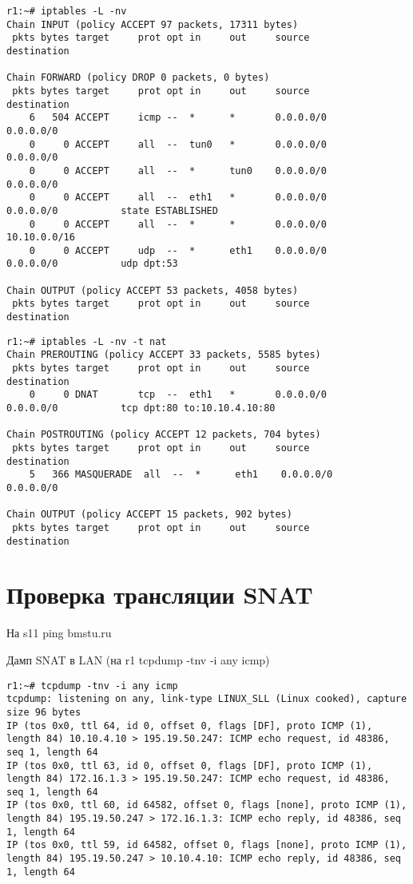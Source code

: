 \documentclass[a4paper,12pt]{article}
\begin{document}
\begin{Verbatim}
r1:~# iptables -L -nv
Chain INPUT (policy ACCEPT 97 packets, 17311 bytes)
 pkts bytes target     prot opt in     out     source               destination         

Chain FORWARD (policy DROP 0 packets, 0 bytes)
 pkts bytes target     prot opt in     out     source               destination         
    6   504 ACCEPT     icmp --  *      *       0.0.0.0/0            0.0.0.0/0           
    0     0 ACCEPT     all  --  tun0   *       0.0.0.0/0            0.0.0.0/0           
    0     0 ACCEPT     all  --  *      tun0    0.0.0.0/0            0.0.0.0/0           
    0     0 ACCEPT     all  --  eth1   *       0.0.0.0/0            0.0.0.0/0           state ESTABLISHED 
    0     0 ACCEPT     all  --  *      *       0.0.0.0/0            10.10.0.0/16        
    0     0 ACCEPT     udp  --  *      eth1    0.0.0.0/0            0.0.0.0/0           udp dpt:53 

Chain OUTPUT (policy ACCEPT 53 packets, 4058 bytes)
 pkts bytes target     prot opt in     out     source               destination         
\end{Verbatim}

\begin{Verbatim}
r1:~# iptables -L -nv -t nat
Chain PREROUTING (policy ACCEPT 33 packets, 5585 bytes)
 pkts bytes target     prot opt in     out     source               destination         
    0     0 DNAT       tcp  --  eth1   *       0.0.0.0/0            0.0.0.0/0           tcp dpt:80 to:10.10.4.10:80 

Chain POSTROUTING (policy ACCEPT 12 packets, 704 bytes)
 pkts bytes target     prot opt in     out     source               destination         
    5   366 MASQUERADE  all  --  *      eth1    0.0.0.0/0            0.0.0.0/0           

Chain OUTPUT (policy ACCEPT 15 packets, 902 bytes)
 pkts bytes target     prot opt in     out     source               destination 
\end{Verbatim}

\section{Проверка трансляции SNAT}

На s11 ping bmstu.ru

Дамп SNAT в LAN (на r1 tcpdump -tnv -i any icmp)

\begin{Verbatim}
r1:~# tcpdump -tnv -i any icmp
tcpdump: listening on any, link-type LINUX_SLL (Linux cooked), capture size 96 bytes
IP (tos 0x0, ttl 64, id 0, offset 0, flags [DF], proto ICMP (1), length 84) 10.10.4.10 > 195.19.50.247: ICMP echo request, id 48386, seq 1, length 64
IP (tos 0x0, ttl 63, id 0, offset 0, flags [DF], proto ICMP (1), length 84) 172.16.1.3 > 195.19.50.247: ICMP echo request, id 48386, seq 1, length 64
IP (tos 0x0, ttl 60, id 64582, offset 0, flags [none], proto ICMP (1), length 84) 195.19.50.247 > 172.16.1.3: ICMP echo reply, id 48386, seq 1, length 64
IP (tos 0x0, ttl 59, id 64582, offset 0, flags [none], proto ICMP (1), length 84) 195.19.50.247 > 10.10.4.10: ICMP echo reply, id 48386, seq 1, length 64
\end{Verbatim}
\end{document}
